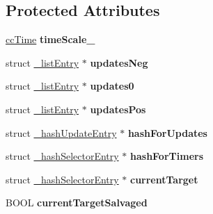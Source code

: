 \subsection*{Protected Attributes}
\begin{DoxyCompactItemize}
\item 
\hypertarget{class_c_c_scheduler_a953795b5fc80b70df5c8ab870c040dd6}{\hyperlink{cc_types_8h_ae6c674aac4bfb46a4e6cb1e89bb66b4f}{cc\-Time} {\bfseries time\-Scale\-\_\-}}\label{class_c_c_scheduler_a953795b5fc80b70df5c8ab870c040dd6}

\item 
\hypertarget{class_c_c_scheduler_aee62ae1ef50145d937a38ba9c6af12fe}{struct \hyperlink{struct__list_entry}{\-\_\-list\-Entry} $\ast$ {\bfseries updates\-Neg}}\label{class_c_c_scheduler_aee62ae1ef50145d937a38ba9c6af12fe}

\item 
\hypertarget{class_c_c_scheduler_afa3a685478662b1b12f1d3455e773c29}{struct \hyperlink{struct__list_entry}{\-\_\-list\-Entry} $\ast$ {\bfseries updates0}}\label{class_c_c_scheduler_afa3a685478662b1b12f1d3455e773c29}

\item 
\hypertarget{class_c_c_scheduler_a83c99c999c564c860dc915954335588f}{struct \hyperlink{struct__list_entry}{\-\_\-list\-Entry} $\ast$ {\bfseries updates\-Pos}}\label{class_c_c_scheduler_a83c99c999c564c860dc915954335588f}

\item 
\hypertarget{class_c_c_scheduler_aa9f0c6e0ab470174f34832c02bed5cc4}{struct \hyperlink{struct__hash_update_entry}{\-\_\-hash\-Update\-Entry} $\ast$ {\bfseries hash\-For\-Updates}}\label{class_c_c_scheduler_aa9f0c6e0ab470174f34832c02bed5cc4}

\item 
\hypertarget{class_c_c_scheduler_a53138e145eb084c6d8a235e82fe7c7b0}{struct \hyperlink{struct__hash_selector_entry}{\-\_\-hash\-Selector\-Entry} $\ast$ {\bfseries hash\-For\-Timers}}\label{class_c_c_scheduler_a53138e145eb084c6d8a235e82fe7c7b0}

\item 
\hypertarget{class_c_c_scheduler_a4018b55f1f007c5414a738d22074dbf7}{struct \hyperlink{struct__hash_selector_entry}{\-\_\-hash\-Selector\-Entry} $\ast$ {\bfseries current\-Target}}\label{class_c_c_scheduler_a4018b55f1f007c5414a738d22074dbf7}

\item 
\hypertarget{class_c_c_scheduler_a75f829cd70a53bdd41622a646de677d0}{B\-O\-O\-L {\bfseries current\-Target\-Salvaged}}\label{class_c_c_scheduler_a75f829cd70a53bdd41622a646de677d0}


\end{DoxyCompactItemize}
